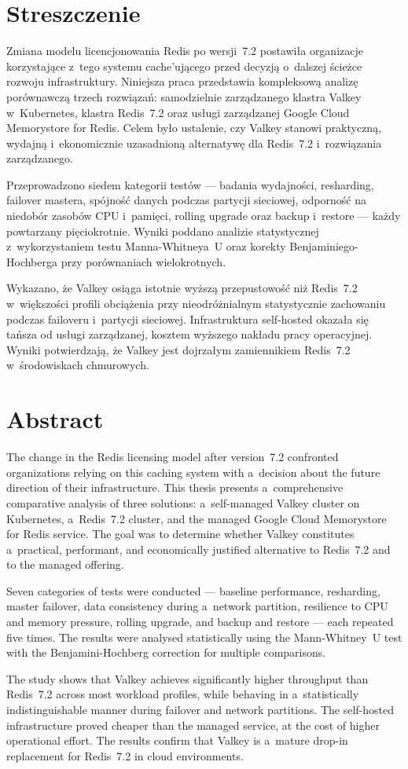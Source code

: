 \section*{Streszczenie}

Zmiana modelu licencjonowania Redis po wersji~7.2 postawiła organizacje korzystające z~tego systemu cache'ującego przed decyzją o~dalszej ścieżce rozwoju infrastruktury. Niniejsza praca przedstawia kompleksową analizę porównawczą trzech rozwiązań: samodzielnie zarządzanego klastra Valkey w~Kubernetes, klastra Redis~7.2 oraz usługi zarządzanej Google Cloud Memorystore for Redis. Celem było ustalenie, czy Valkey stanowi praktyczną, wydajną i~ekonomicznie uzasadnioną alternatywę dla Redis~7.2 i~rozwiązania zarządzanego.

Przeprowadzono siedem kategorii testów --- badania wydajności, resharding, failover mastera, spójność danych podczas partycji sieciowej, odporność na niedobór zasobów CPU i~pamięci, rolling upgrade oraz backup i~restore --- każdy powtarzany pięciokrotnie. Wyniki poddano analizie statystycznej z~wykorzystaniem testu Manna-Whitneya~U oraz korekty Benjaminiego-Hochberga przy porównaniach wielokrotnych.

Wykazano, że Valkey osiąga istotnie wyższą przepustowość niż Redis~7.2 w~większości profili obciążenia przy nieodróżnialnym statystycznie zachowaniu podczas failoveru i~partycji sieciowej. Infrastruktura self-hosted okazała się tańsza od usługi zarządzanej, kosztem wyższego nakładu pracy operacyjnej. Wyniki potwierdzają, że Valkey jest dojrzałym zamiennikiem Redis~7.2 w~środowiskach chmurowych.

\section*{Abstract}

The change in the Redis licensing model after version~7.2 confronted organizations relying on this caching system with a~decision about the future direction of their infrastructure. This thesis presents a~comprehensive comparative analysis of three solutions: a~self-managed Valkey cluster on Kubernetes, a~Redis~7.2 cluster, and the managed Google Cloud Memorystore for Redis service. The goal was to determine whether Valkey constitutes a~practical, performant, and economically justified alternative to Redis~7.2 and to the managed offering.

Seven categories of tests were conducted --- baseline performance, resharding, master failover, data consistency during a~network partition, resilience to CPU and memory pressure, rolling upgrade, and backup and restore --- each repeated five times. The results were analysed statistically using the Mann-Whitney~U test with the Benjamini-Hochberg correction for multiple comparisons.

The study shows that Valkey achieves significantly higher throughput than Redis~7.2 across most workload profiles, while behaving in a~statistically indistinguishable manner during failover and network partitions. The self-hosted infrastructure proved cheaper than the managed service, at the cost of higher operational effort. The results confirm that Valkey is a~mature drop-in replacement for Redis~7.2 in cloud environments.
